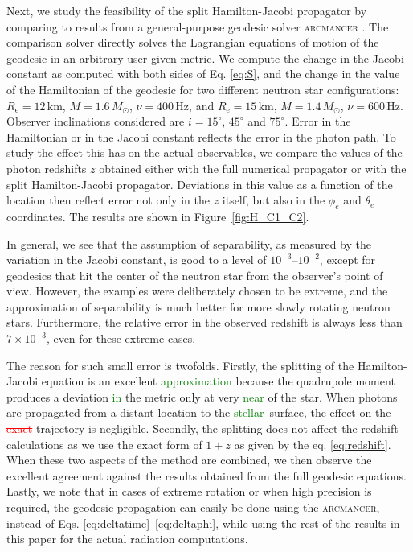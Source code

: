 \documentclass{aa}
\newcommand{\refe}[1]{\textcolor{green}{{#1}}}
\newcommand{\refedel}[1]{\textcolor{red}{\sout{#1}}}
\newcommand{\Msun}{\ensuremath{M_{\odot}}}
\begin{document}
Next, we study the feasibility of the split Hamilton-Jacobi propagator by comparing to results from a general-purpose geodesic solver \textsc{arcmancer} \citep{PRJ16}.
The comparison solver directly solves the Lagrangian equations of motion of the geodesic in an arbitrary user-given metric. 
We compute the change in the Jacobi constant as computed with both sides of Eq. \eqref{eq:S}, and the change in the value of the Hamiltonian of the geodesic for two different neutron star configurations:
$R_{\mathrm{e}}=12\,\mathrm{km}$, $M=1.6\,\Msun$, $\nu=400\,\mathrm{Hz}$, and $R_{\mathrm{e}}=15\,\mathrm{km}$, $M=1.4\,\Msun$, $\nu=600\,\mathrm{Hz}$.
Observer inclinations considered are $i=15^\circ$, $45^\circ$ and $75^\circ$.
Error in the Hamiltonian or in the Jacobi constant reflects the error in the photon path.
To study the effect this has on the actual observables, we compare the values of the photon redshifts $z$ obtained either with the full numerical propagator or with the split Hamilton-Jacobi propagator.
Deviations in this value as a function of the location then reflect error not only in the $z$ itself, but also in the $\phi_e$ and $\theta_e$ coordinates.
The results are shown in Figure~\ref{fig:H_C1_C2}. 

In general, we see that the assumption of separability, as measured by the variation in the Jacobi constant, is good to a level of $10^{-3}$--$10^{-2}$, except for geodesics that hit the center of the neutron star from the observer's point of view. 
However, the examples were deliberately chosen to be extreme, and the approximation of separability is much better for more slowly rotating neutron stars.
Furthermore, the relative error in the observed redshift is always less than $7 \times 10^{-3}$, even for these extreme cases.

The reason for such small error is twofolds.
Firstly, the splitting of the Hamilton-Jacobi equation is an excellent \refe{approximation} because the quadrupole moment produces a deviation \refe{in} the metric only at very \refe{near} of the star.
When photons are propagated from a distant location to the \refe{stellar} surface, the effect on the \refedel{exact} trajectory is negligible.
Secondly, the splitting does not affect the redshift calculations as we use the exact form of $1+z$ as given by the eq. \eqref{eq:redshift}.
When these two aspects of the method are combined, we then observe the excellent agreement against the results obtained from the full geodesic equations.
Lastly, we note that in cases of extreme rotation or when high precision is required, the geodesic propagation can easily be done using the \textsc{arcmancer}, instead of Eqs. \eqref{eq:deltatime}--\eqref{eq:deltaphi}, while using the rest of the results in this paper for the actual radiation computations.
\end{document}

